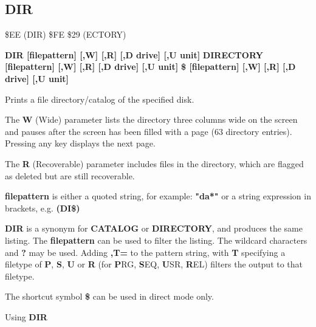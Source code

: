 
\newpage
\subsection{DIR}
\begin{description}[leftmargin=2cm,style=nextline]
\item [Token:] \$EE (DIR) \$FE \$29 (ECTORY)
\item [Format:] {\bf DIR [filepattern] [,W] [,R] [,D drive] [,U unit] }
                {\bf DIRECTORY [filepattern] [,W] [,R] [,D drive] [,U unit] }
                {\bf \$ [filepattern] [,W] [,R] [,D drive] [,U unit] }
\item [Usage:]  Prints a file directory/catalog of the specified disk.

   The {\bf W} (Wide) parameter lists the directory three columns wide
   on the screen and pauses after the screen has been filled with a page
   (63 directory entries). Pressing any key displays the next page.

   The {\bf R} (Recoverable) parameter includes files in the
   directory, which are flagged as deleted but are still
   recoverable.

   {\bf filepattern} is either a quoted string, for example: {\bf "da*"} or
   a string expression in brackets, e.g. {\bf (DI\$)}

   \drivedefinition

   \unitdefinition

\item [Remarks:]
   {\bf DIR} is a synonym for {\bf CATALOG}
   or {\bf DIRECTORY}, and produces the same listing.
   The {\bf filepattern} can be used to filter the listing.
   The wildcard characters {\bf *} and {\bf ?} may be used.
   Adding {\bf ,T=} to the pattern string, with {\bf T} specifying
   a filetype of {\bf P}, {\bf S}, {\bf U} or {\bf R}
   (for {\bf P}RG, {\bf S}EQ, {\bf U}SR, {\bf R}EL) filters the
   output to that filetype.

   The shortcut symbol {\bf \$} can be used in direct mode only.

\item [Examples:] Using {\bf DIR}


%
%
%
%
%


\end{description}
